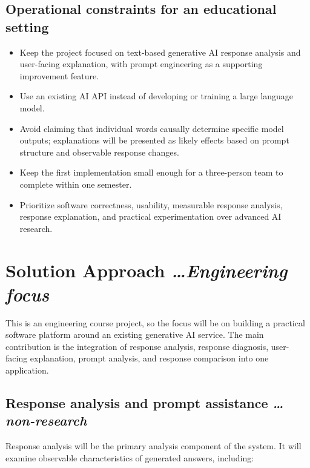 \documentclass[11pt,a4paper]{article}
\newcommand{\BvrHint}[1]{%
  {\normalfont\normalsize\itshape\hfill #1}}
\begin{document}
\subsection{Operational constraints for an educational setting}

\begin{itemize}[leftmargin=0.7cm]
    \item Keep the project focused on text-based generative AI response
    analysis and user-facing explanation, with prompt engineering as a
    supporting improvement feature.
    \item Use an existing AI API instead of developing or training a large
    language model.
    \item Avoid claiming that individual words causally determine specific
    model outputs; explanations will be presented as likely effects based on
    prompt structure and observable response changes.
    \item Keep the first implementation small enough for a three-person team
    to complete within one semester.
    \item Prioritize software correctness, usability, measurable response
    analysis, response explanation, and practical experimentation over
    advanced AI research.
\end{itemize}

\section{Solution Approach%
  \BvrHint{\ldots Engineering focus}}

This is an engineering course project, so the focus will be on building a
practical software platform around an existing generative AI service. The
main contribution is the integration of response analysis, response
diagnosis, user-facing explanation, prompt analysis, and response comparison
into one application.

\subsection{Response analysis and prompt assistance%
  \BvrHint{\ldots non-research}}

Response analysis will be the primary analysis component of the system.
It will examine observable characteristics of generated answers, including:
\end{document}
